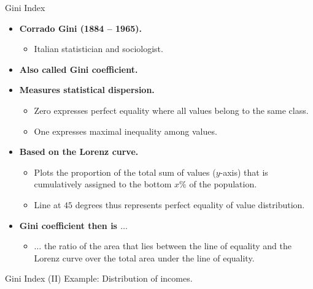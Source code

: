 \begin{frame}{Gini Index}
	\begin{itemize}
		\item \textbf{Corrado Gini (1884 -- 1965).}
		      \begin{itemize}
			      \item Italian statistician and sociologist.
		      \end{itemize}
		\item \textbf{Also called Gini coefficient.}
		\item \textbf{Measures statistical dispersion.}
		      \begin{itemize}
			      \item Zero expresses perfect equality where all values belong to the same class.
			      \item One expresses maximal inequality among values.
		      \end{itemize}
		\item \textbf{Based on the Lorenz curve.}
		      \begin{itemize}
			      \item Plots the proportion of the total sum of values ($y$-axis) that is cumulatively assigned to the bottom $x\%$ of the population.
			      \item Line at $45$ degrees thus represents perfect equality of value distribution.
		      \end{itemize}
		\item \textbf{Gini coefficient then is $\ldots$}
		      \begin{itemize}
			      \item $\ldots$ the ratio of the area that lies between the line of equality and the Lorenz curve over the total area under the line of equality.
		      \end{itemize}
	\end{itemize}
\end{frame}

\begin{frame}{Gini Index (II)} %
	\centering
	Example: Distribution of incomes.\\[0.5cm]
\end{frame}

